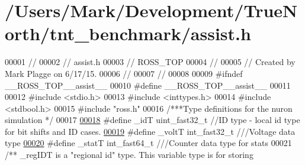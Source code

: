 \hypertarget{assist_8h_source}{}\section{/\+Users/\+Mark/\+Development/\+True\+North/tnt\+\_\+benchmark/assist.h}

\begin{DoxyCode}
00001 \textcolor{comment}{//}
00002 \textcolor{comment}{//  assist.h}
00003 \textcolor{comment}{//  ROSS\_TOP}
00004 \textcolor{comment}{//}
00005 \textcolor{comment}{//  Created by Mark Plagge on 6/17/15.}
00006 \textcolor{comment}{//}
00007 \textcolor{comment}{//}
00008 
00009 \textcolor{preprocessor}{#}\textcolor{preprocessor}{ifndef} \textcolor{preprocessor}{\_\_ROSS\_TOP\_\_assist\_\_}
00010 \textcolor{preprocessor}{#}\textcolor{preprocessor}{define} \textcolor{preprocessor}{\_\_ROSS\_TOP\_\_assist\_\_}
00011 
00012 \textcolor{preprocessor}{#}\textcolor{preprocessor}{include} \textcolor{preprocessor}{<}\textcolor{preprocessor}{stdio}\textcolor{preprocessor}{.}\textcolor{preprocessor}{h}\textcolor{preprocessor}{>}
00013 \textcolor{preprocessor}{#}\textcolor{preprocessor}{include} \textcolor{preprocessor}{<}\textcolor{preprocessor}{inttypes}\textcolor{preprocessor}{.}\textcolor{preprocessor}{h}\textcolor{preprocessor}{>}
00014 \textcolor{preprocessor}{#}\textcolor{preprocessor}{include} \textcolor{preprocessor}{<}\textcolor{preprocessor}{stdbool}\textcolor{preprocessor}{.}\textcolor{preprocessor}{h}\textcolor{preprocessor}{>}
00015 \textcolor{preprocessor}{#}\textcolor{preprocessor}{include} \textcolor{preprocessor}{"ross.h"}
00016 \textcolor{comment}{/***Type definitions for the nuron simulation */}
00017 
\hypertarget{assist_8h_source_l00018}{}\hyperlink{assist_8h_a3f7a6e6a1210b6d9d7a42177dcb9634b}{00018} \textcolor{preprocessor}{#}\textcolor{preprocessor}{define} \textcolor{preprocessor}{\_idT} \textcolor{preprocessor}{uint\_fast32\_t} \textcolor{comment}{//ID type - local id type for bit shifts and ID cases.}
\hypertarget{assist_8h_source_l00019}{}\hyperlink{assist_8h_abe1fc1b8f9efd1187e564bcb8de7f815}{00019} \textcolor{preprocessor}{#}\textcolor{preprocessor}{define} \textcolor{preprocessor}{\_voltT} \textcolor{preprocessor}{int\_fast32\_t} \textcolor{comment}{///Voltage data type}
\hypertarget{assist_8h_source_l00020}{}\hyperlink{assist_8h_ad77e6fc5a9b03d46e7c97b7c4b92e89f}{00020} \textcolor{preprocessor}{#}\textcolor{preprocessor}{define} \textcolor{preprocessor}{\_statT} \textcolor{preprocessor}{int\_fast64\_t} \textcolor{comment}{///Counter data type for stats}
00021 \textcolor{comment}{/** \_regIDT is a "regional id" type. This variable type is for storing}

\end{DoxyCode}
